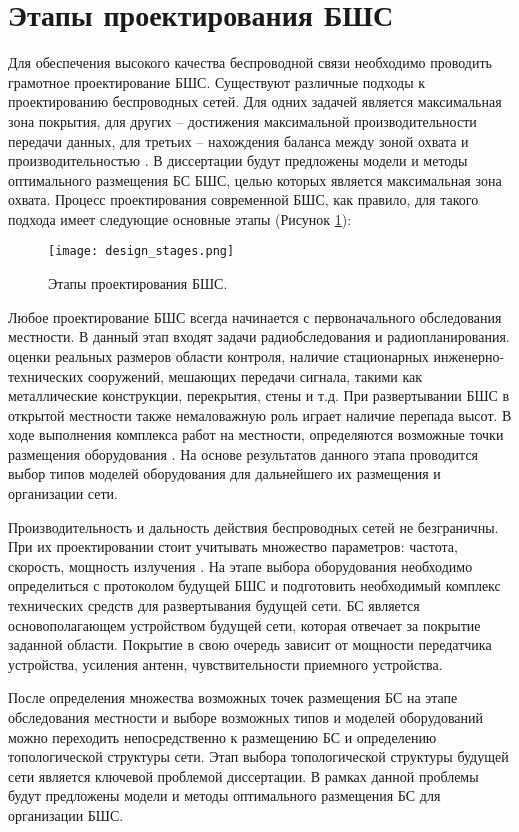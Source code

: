\section{Этапы проектирования БШС}

Для обеспечения высокого качества беспроводной связи необходимо проводить грамотное проектирование БШС. Существуют различные подходы к проектированию беспроводных сетей. Для одних задачей является максимальная зона покрытия, для других -- достижения максимальной производительности передачи данных, для третьих -- нахождения баланса между зоной охвата и производительностью \cite{Proletarsky}. В диссертации будут предложены модели и методы оптимального размещения БС БШС, целью которых является максимальная зона охвата.  Процесс проектирования современной БШС, как правило, для такого подхода имеет следующие основные этапы (Рисунок \cref{fig:part1_design_stages}):

\begin{figure}[h!]
  \centering
   \texttt{[image: design\_stages.png]}
\caption{Этапы проектирования БШС.}
\label{fig:part1_design_stages}
\end{figure}

Любое проектирование БШС всегда начинается с первоначального обследования местности. В данный этап входят задачи радиобследования и радиопланирования. оценки реальных размеров области контроля, наличие стационарных инженерно-технических сооружений, мешающих передачи сигнала, такими как металлические конструкции, перекрытия, стены и т.д. При развертывании БШС в открытой местности также немаловажную роль играет наличие перепада высот. В ходе выполнения комплекса работ на местности, определяются возможные точки размещения оборудования \cite{Dunaitsev2017}. На основе результатов данного этапа проводится выбор типов моделей оборудования для дальнейшего их размещения и организации сети.

Производительность и дальность действия беспроводных сетей не безграничны. При их проектировании стоит учитывать множество параметров: частота, скорость, мощность излучения \cite{Proletarsky}. На этапе выбора оборудования необходимо определиться с протоколом будущей БШС и  подготовить необходимый комплекс технических средств для развертывания будущей сети. БС является основополагающем устройством будущей сети, которая отвечает за покрытие заданной области. Покрытие в свою очередь зависит от мощности передатчика устройства, усиления антенн, чувствительности приемного устройства.


После определения множества возможных точек размещения БС на этапе обследования местности и выборе возможных типов и моделей оборудований можно переходить непосредственно к размещению БС и определению топологической структуры сети. Этап выбора топологической структуры будущей сети является ключевой проблемой диссертации. В рамках данной проблемы будут предложены модели и методы оптимального размещения БС для организации БШС.

